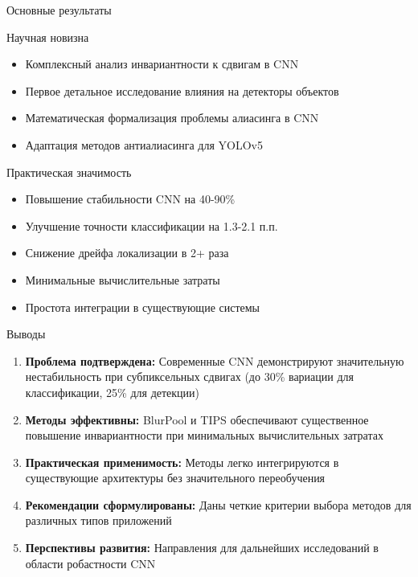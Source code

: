 \documentclass[aspectratio=169]{beamer}
\begin{document}
\begin{frame}{Основные результаты}
    \begin{block}{Научная новизна}
        \begin{itemize}
            \item Комплексный анализ инвариантности к сдвигам в CNN
            \item Первое детальное исследование влияния на детекторы объектов
            \item Математическая формализация проблемы алиасинга в CNN
            \item Адаптация методов антиалиасинга для YOLOv5
        \end{itemize}
    \end{block}
    
    \begin{block}{Практическая значимость}
        \begin{itemize}
            \item Повышение стабильности CNN на 40-90\%
            \item Улучшение точности классификации на 1.3-2.1 п.п.
            \item Снижение дрейфа локализации в 2+ раза
            \item Минимальные вычислительные затраты
            \item Простота интеграции в существующие системы
        \end{itemize}
    \end{block}
\end{frame}

\begin{frame}{Выводы}
    \begin{enumerate}
        \item \textbf{Проблема подтверждена:} Современные CNN демонстрируют значительную нестабильность при субпиксельных сдвигах (до 30\% вариации для классификации, 25\% для детекции)
        
        \item \textbf{Методы эффективны:} BlurPool и TIPS обеспечивают существенное повышение инвариантности при минимальных вычислительных затратах
        
        \item \textbf{Практическая применимость:} Методы легко интегрируются в существующие архитектуры без значительного переобучения
        
        \item \textbf{Рекомендации сформулированы:} Даны четкие критерии выбора методов для различных типов приложений
        
        \item \textbf{Перспективы развития:} Направления для дальнейших исследований в области робастности CNN
    \end{enumerate}
\end{frame}
\end{document}
